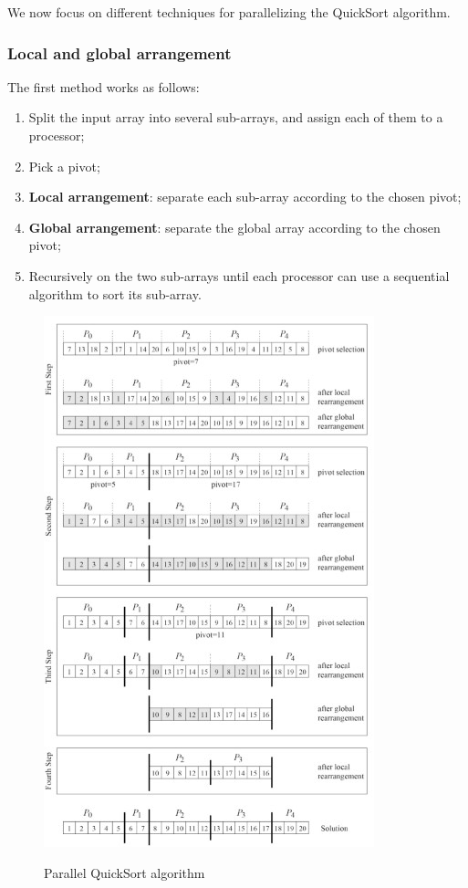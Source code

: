 We now focus on different techniques for parallelizing the QuickSort algorithm.

\subsubsection{Local and global arrangement}
The first method works as follows:

\begin{enumerate}
    \item Split the input array into several sub-arrays, and assign each of them to a processor;
    \item Pick a pivot;
    \item \textbf{Local arrangement}: separate each sub-array according to the chosen pivot;
    \item \textbf{Global arrangement}: separate the global array according to the chosen pivot;
    \item Recursively on the two sub-arrays until each processor can use a sequential algorithm to sort its sub-array.
\end{enumerate}

\begin{figure}[h!]
		\centering
		\includegraphics[scale = 2.0]{img/parallel quicksort.jpg}
        \label{quicksort par}
        \caption{Parallel QuickSort algorithm}
\end{figure}

